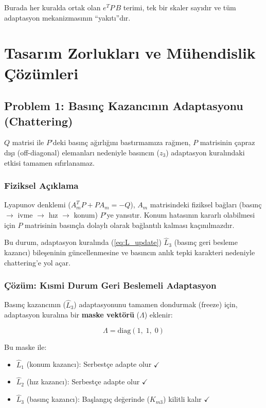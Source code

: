 \documentclass[12pt,a4paper]{article}
\begin{document}
Burada her kuralda ortak olan $e^T P\,B$ terimi, tek bir skaler sayıdır ve tüm adaptasyon mekanizmasının ``yakıtı''dır.

\section{Tasarım Zorlukları ve Mühendislik Çözümleri}
\label{sec:challenges}

\subsection{Problem 1: Basınç Kazancının Adaptasyonu (Chattering)}
\label{subsec:partial_adaptation}

$Q$ matrisi ile $P$'deki basınç ağırlığını bastırmamıza rağmen, $P$ matrisinin çapraz dışı (off-diagonal) elemanları nedeniyle basıncın ($z_3$) adaptasyon kuralındaki etkisi tamamen sıfırlanamaz.

\subsubsection{Fiziksel Açıklama}
Lyapunov denklemi ($A_m^T P + P A_m = -Q$), $A_m$ matrisindeki fiziksel bağları (basınç $\to$ ivme $\to$ hız $\to$ konum) $P$'ye yansıtır. Konum hatasının kararlı olabilmesi için $P$ matrisinin basınçla dolaylı olarak bağlantılı kalması kaçınılmazdır.

Bu durum, adaptasyon kuralında (\ref{eq:L_update}) $\hat{L}_3$ (basınç geri besleme kazancı) bileşeninin güncellenmesine ve basıncın anlık tepki karakteri nedeniyle chattering'e yol açar.

\subsubsection{Çözüm: Kısmi Durum Geri Beslemeli Adaptasyon}

Basınç kazancının ($\hat{L}_3$) adaptasyonunu tamamen dondurmak (freeze) için, adaptasyon kuralına bir \textbf{maske vektörü} ($\Lambda$) eklenir:

\begin{equation}
    \Lambda = \text{diag}(1,\; 1,\; 0)
    \label{eq:mask}
\end{equation}

Bu maske ile:
\begin{itemize}
    \item $\hat{L}_1$ (konum kazancı): Serbestçe adapte olur $\checkmark$
    \item $\hat{L}_2$ (hız kazancı): Serbestçe adapte olur $\checkmark$
    \item $\hat{L}_3$ (basınç kazancı): Başlangıç değerinde ($K_{m3}$) kilitli kalır $\checkmark$
\end{itemize}
\end{document}
